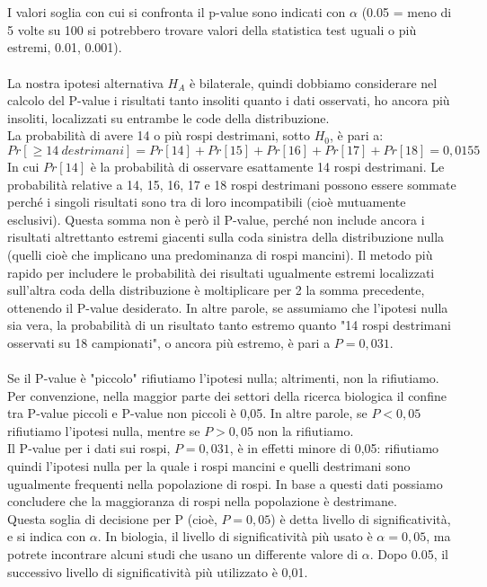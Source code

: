 \documentclass[drafts, 10pt]{book}
\begin{document}
\\
\\
I valori soglia con cui si confronta il p-value sono indicati con $\alpha$ (0.05 = meno di 5 volte su 100 si potrebbero trovare valori della statistica test uguali o più estremi, 0.01, 0.001).
\\
\\
La nostra ipotesi alternativa $H_A$ è bilaterale, quindi dobbiamo considerare nel calcolo del P-value i risultati tanto insoliti quanto i dati osservati, ho ancora più insoliti, localizzati su entrambe le code della distribuzione.
\\
La probabilità di avere 14 o più rospi destrimani, sotto $H_0$, è pari a:
\begin{equation}
    Pr[\ge 14\ destrimani] = Pr[14] + Pr[15] + Pr[16] + Pr[17] + Pr[18] = 0,0155 
\end{equation}
In cui $Pr[14]$ è la probabilità di osservare esattamente 14 rospi destrimani. Le probabilità relative a 14, 15, 16, 17 e 18 rospi destrimani possono essere sommate perché i singoli risultati sono tra di loro incompatibili (cioè mutuamente esclusivi). Questa somma non è però il P-value, perché non include ancora i risultati altrettanto estremi giacenti sulla coda sinistra della distribuzione nulla (quelli cioè che implicano una predominanza di rospi mancini). Il metodo più rapido per includere le probabilità dei risultati ugualmente estremi localizzati sull'altra coda della distribuzione è moltiplicare per 2 la somma precedente, ottenendo il P-value desiderato. In altre parole, se assumiamo che l'ipotesi nulla sia vera, la probabilità di un risultato tanto estremo quanto "14 rospi destrimani osservati su 18 campionati", o ancora più estremo, è pari a $P = 0,031$. 
\\
\\
Se il P-value è "piccolo" rifiutiamo l'ipotesi nulla; altrimenti, non la rifiutiamo. Per convenzione, nella maggior parte dei settori della ricerca biologica il confine tra P-value piccoli e P-value non piccoli è 0,05. In altre parole, se $P< 0,05$ rifiutiamo l'ipotesi nulla, mentre se $P> 0,05$ non la rifiutiamo.
\\
Il P-value per i dati sui rospi, $P= 0,031$, è in effetti minore di 0,05: rifiutiamo quindi l'ipotesi nulla per la quale i rospi mancini e quelli destrimani sono ugualmente frequenti nella popolazione di rospi. In base a questi dati possiamo concludere che la maggioranza di rospi nella popolazione è destrimane.
\\
Questa soglia di decisione per P (cioè, $P= 0,05$) è detta livello di significatività, e si indica con $\alpha$. In biologia, il livello di significatività più usato è $\alpha = 0,05$, ma potrete incontrare alcuni studi che usano un differente valore di $\alpha$. Dopo 0.05, il successivo livello di significatività più utilizzato è 0,01.
\end{document}
